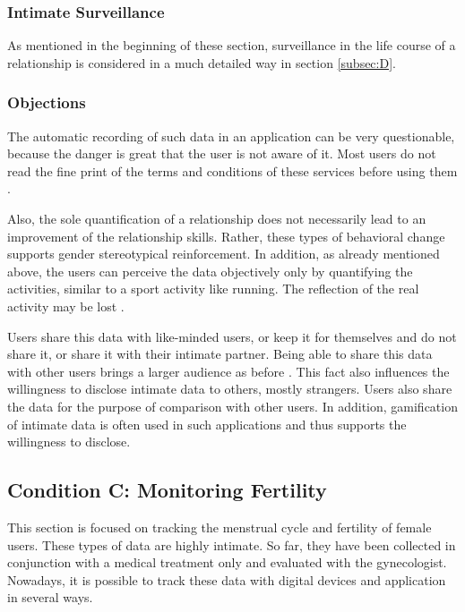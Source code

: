 \subsubsection{Intimate Surveillance}
As mentioned in the beginning of these section, surveillance in the life course of a relationship is considered in a much detailed way in section \ref{subsec:D}.

\subsubsection{Objections}
The automatic recording of such data in an application can be very questionable, because the danger is great that the user is not aware of it. Most users do not read the fine print of the terms and conditions of these services before using them \cite{anaya2018ethical}.

Also, the sole quantification of a relationship does not necessarily lead to an improvement of the relationship skills. Rather, these types of behavioral change supports gender stereotypical reinforcement.
In addition, as already mentioned above, the users can perceive the data objectively only by quantifying the activities, similar to a sport activity like running. The reflection of the real activity may be lost \cite{doi:10.1080/13691058.2014.920528}.

Users share this data with like-minded users, or keep it for themselves and do not share it, or share it with their intimate partner.
Being able to share this data with other users brings a larger audience as before \cite{doi:10.1080/13691058.2014.920528}. This fact also influences the willingness to disclose intimate data to others, mostly strangers.
Users also share the data for the purpose of comparison with other users. In addition, gamification of intimate data is often used in such applications and thus supports the willingness to disclose.

\subsection{Condition C: Monitoring Fertility}
\label{subsec:c}
This section is focused on tracking the menstrual cycle and fertility of female users. These types of data are highly intimate. So far, they have been collected in conjunction with a medical treatment only and evaluated with the 
gynecologist. Nowadays, it is possible to track these data with digital devices and application in several ways.
